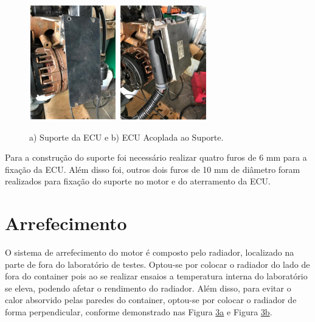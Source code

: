 \begin{figure}[h!]
\begin{center}
	\includegraphics[height=5cm]{figuras/suporte-ecu.png} \quad
	\includegraphics[height=5cm]{figuras/ecu-acoplada.png}
	\caption{a) Suporte da ECU e b) ECU Acoplada ao Suporte.}
 	\label{fig:ecu}
\end{center}
\end{figure}

Para a construção do suporte foi necessário realizar quatro furos de 6 mm para a fixação da ECU. Além disso foi, outros dois furos de 10 mm de diâmetro foram realizados para fixação do suporte no motor e do aterramento da ECU.

\section{Arrefecimento}

O sistema de arrefecimento do motor é composto pelo radiador, localizado na parte de fora do laboratório de testes. Optou-se por colocar o radiador do lado de fora do container pois ao se realizar ensaios a temperatura interna do laboratório se eleva, podendo afetar o rendimento do radiador. Além disso, para evitar o calor absorvido pelas paredes do container, optou-se por colocar o radiador de forma perpendicular, conforme demonstrado nas Figura \hyperref[fig:vistaradiador]{3a} e Figura \hyperref[fig:vistaradiador]{3b}.


